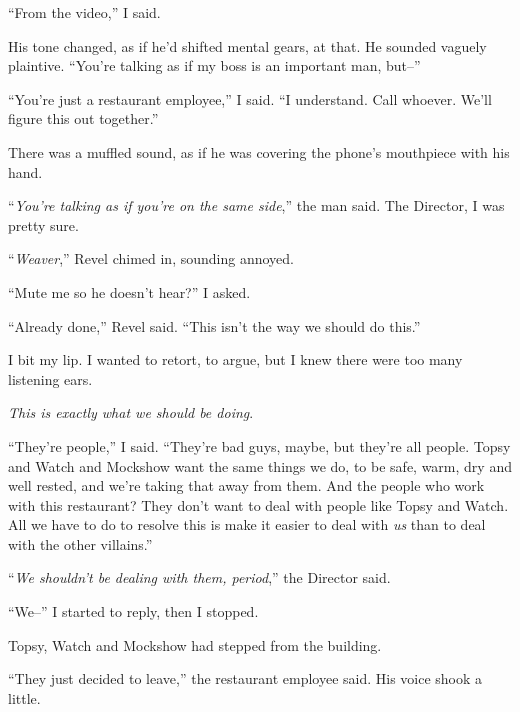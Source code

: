 ``From the video,'' I said.



His tone changed, as if he'd shifted mental gears, at that.  He sounded vaguely plaintive.  ``You're talking as if my boss is an important man, but--''



``You're just a restaurant employee,'' I said.  ``I understand.  Call whoever.  We'll figure this out together.''



There was a muffled sound, as if he was covering the phone's mouthpiece with his hand.



``\emph{You're talking as if you're on the same side},'' the man said.  The Director, I was pretty sure.



``\emph{Weaver},'' Revel chimed in, sounding annoyed.



``Mute me so he doesn't hear?'' I asked.



``Already done,'' Revel said.  ``This isn't the way we should do this.''



I bit my lip.  I wanted to retort, to argue, but I knew there were too many listening ears.



\emph{This is exactly what we should be doing}.



``They're people,'' I said.  ``They're bad guys, maybe, but they're all people.  Topsy and Watch and Mockshow want the same things we do, to be safe, warm, dry and well rested, and we're taking that away from them.  And the people who work with this restaurant?  They don't want to deal with people like Topsy and Watch.  All we have to do to resolve this is make it easier to deal with \emph{us} than to deal with the other villains.''



``\emph{We shouldn't be dealing with them, period},'' the Director said.



``We--'' I started to reply, then I stopped.



Topsy, Watch and Mockshow had stepped from the building.



``They just decided to leave,'' the restaurant employee said.  His voice shook a little.



